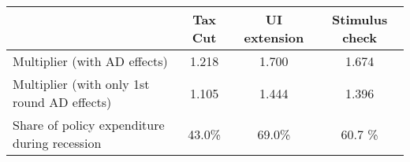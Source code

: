 \begin{tabular}{@{}lccc@{}} 
\toprule 
& Tax Cut    & UI extension    & Stimulus check    \\  \midrule 
Multiplier (with AD effects) &1.218  & 1.700  & 1.674     \\ 
Multiplier (with only 1st round AD effects) &1.105  & 1.444  & 1.396     \\ 
Share of policy expenditure during recession &43.0\%  & 69.0\%  & 60.7 \%    \\ 
\end{tabular}  
